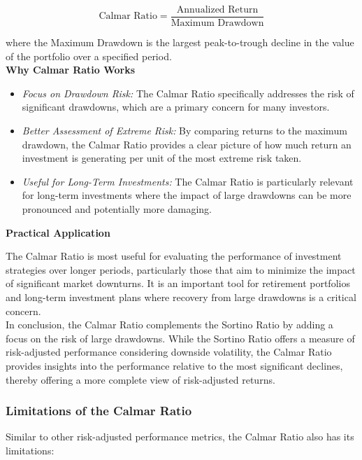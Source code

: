 \documentclass{article}
\begin{document}
\begin{equation}
    \text{Calmar Ratio} = \frac{\text{Annualized Return}}{\text{Maximum Drawdown}}
\end{equation}

where the Maximum Drawdown is the largest peak-to-trough decline in the value of the portfolio over a specified period. \\

\textbf{Why Calmar Ratio Works}

\begin{itemize}
    \item \textit{Focus on Drawdown Risk:} The Calmar Ratio specifically addresses the risk of significant drawdowns, which are a primary concern for many investors.
    \item \textit{Better Assessment of Extreme Risk:} By comparing returns to the maximum drawdown, the Calmar Ratio provides a clear picture of how much return an investment is generating per unit of the most extreme risk taken.
    \item \textit{Useful for Long-Term Investments:} The Calmar Ratio is particularly relevant for long-term investments where the impact of large drawdowns can be more pronounced and potentially more damaging.
\end{itemize}

\textbf{Practical Application}

The Calmar Ratio is most useful for evaluating the performance of investment strategies over longer periods, particularly those that aim to minimize the impact of significant market downturns. It is an important tool for retirement portfolios and long-term investment plans where recovery from large drawdowns is a critical concern. \\

In conclusion, the Calmar Ratio complements the Sortino Ratio by adding a focus on the risk of large drawdowns. While the Sortino Ratio offers a measure of risk-adjusted performance considering downside volatility, the Calmar Ratio provides insights into the performance relative to the most significant declines, thereby offering a more complete view of risk-adjusted returns.

\subsubsection{Limitations of the Calmar Ratio}

Similar to other risk-adjusted performance metrics, the Calmar Ratio also has its limitations:
\end{document}
